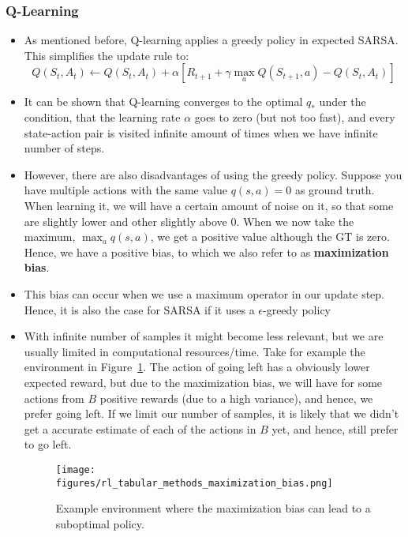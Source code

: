 \subsubsection{Q-Learning}
\begin{itemize}
	\item As mentioned before, Q-learning applies a greedy policy in expected SARSA. This simplifies the update rule to:
	$$Q(S_t,A_t)\leftarrow Q(S_t,A_t) + \alpha\left[R_{t+1}+\gamma \max_a  Q(S_{t+1},a)-Q(S_t,A_t)\right]$$
	\item It can be shown that Q-learning converges to the optimal $q_{*}$ under the condition, that the learning rate $\alpha$ goes to zero (but not too fast), and every state-action pair is visited infinite amount of times when we have infinite number of steps.
	\item However, there are also disadvantages of using the greedy policy. Suppose you have multiple actions with the same value $q(s,a)=0$ as ground truth. When learning it, we will have a certain amount of noise on it, so that some are slightly lower and other slightly above 0. When we now take the maximum, $\max_a q(s,a)$, we get a positive value although the GT is zero. Hence, we have a positive bias, to which we also refer to as \textbf{maximization bias}.
	\item This bias can occur when we use a maximum operator in our update step. Hence, it is also the case for SARSA if it uses a $\epsilon$-greedy policy
	\item With infinite number of samples it might become less relevant, but we are usually limited in computational resources/time. Take for example the environment in Figure~\ref{fig:rl_tabular_methods_maximization_bias}. The action of going left has a obviously lower expected reward, but due to the maximization bias, we will have for some actions from $B$ positive rewards (due to a high variance), and hence, we prefer going left. If we limit our number of samples, it is likely that we didn't get a accurate estimate of each of the actions in $B$ yet, and hence, still prefer to go left.
	\begin{figure}[ht!]
		\centering
		\texttt{[image: figures/rl\_tabular\_methods\_maximization\_bias.png]}
		\caption{Example environment where the maximization bias can lead to a suboptimal policy.}
		\label{fig:rl_tabular_methods_maximization_bias}
	\end{figure}


\end{itemize}
